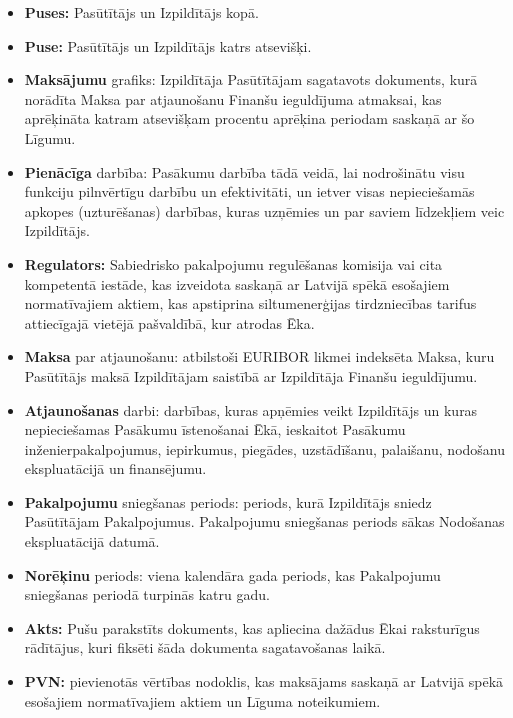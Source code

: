 \begin{multicols}{2}
\begin{itemize}[label={}]
	\item\textbf{Puses:} Pasūtītājs un Izpildītājs kopā.
	\item\textbf{Puse:} Pasūtītājs un Izpildītājs katrs atsevišķi.
	\item\textbf{Maksājumu} grafiks: Izpildītāja Pasūtītājam sagatavots dokuments, kurā norādīta Maksa par atjaunošanu Finanšu ieguldījuma atmaksai, kas aprēķināta katram atsevišķam procentu aprēķina periodam saskaņā ar šo Līgumu.
	\item\textbf{Pienācīga} darbība: Pasākumu darbība tādā veidā, lai nodrošinātu visu funkciju pilnvērtīgu darbību un efektivitāti, un ietver visas nepieciešamās apkopes (uzturēšanas) darbības, kuras uzņēmies un par saviem līdzekļiem veic Izpildītājs.
	\item\textbf{Regulators:} Sabiedrisko pakalpojumu regulēšanas komisija vai cita kompetentā iestāde, kas izveidota saskaņā ar Latvijā spēkā esošajiem normatīvajiem aktiem, kas apstiprina siltumenerģijas tirdzniecības tarifus attiecīgajā vietējā pašvaldībā, kur atrodas Ēka.
	\item\textbf{Maksa} par atjaunošanu: atbilstoši EURIBOR likmei indeksēta Maksa, kuru Pasūtītājs maksā Izpildītājam saistībā ar Izpildītāja Finanšu ieguldījumu.
	\item\textbf{Atjaunošanas} darbi: darbības, kuras apņēmies veikt Izpildītājs un kuras nepieciešamas Pasākumu īstenošanai Ēkā, ieskaitot Pasākumu inženierpakalpojumus, iepirkumus, piegādes, uzstādīšanu, palaišanu, nodošanu ekspluatācijā un finansējumu.
	\item\textbf{Pakalpojumu} sniegšanas periods: periods, kurā Izpildītājs sniedz Pasūtītājam Pakalpojumus. Pakalpojumu sniegšanas periods sākas Nodošanas ekspluatācijā datumā.
	\item\textbf{Norēķinu} periods: viena kalendāra gada periods, kas Pakalpojumu sniegšanas periodā turpinās katru gadu.
	\item\textbf{Akts:} Pušu parakstīts dokuments, kas apliecina dažādus Ēkai raksturīgus rādītājus, kuri fiksēti šāda dokumenta sagatavošanas laikā.
	\item\textbf{PVN:} pievienotās vērtības nodoklis, kas maksājams saskaņā ar Latvijā spēkā esošajiem normatīvajiem aktiem un Līguma noteikumiem.
\end{itemize}


\end{multicols}

